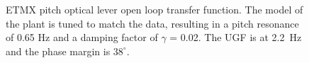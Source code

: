 
\begin{figure}
\begin{centering}
\caption[Optical lever open loop transfer function]{ETMX pitch optical
  lever open loop transfer function. The model of the plant is tuned
  to match the data, resulting in a pitch resonance of 0.65 Hz and a
  damping factor of $\gamma$ = 0.02. The UGF is at 2.2~Hz and the
  phase margin is $38^\circ$.}
\label{fig:oplevOLG}
\end{centering}
\end{figure}





